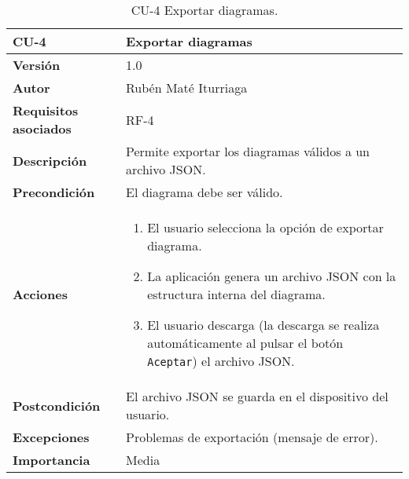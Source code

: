 \begin{table}[p]
	\centering
	\begin{tabularx}{\linewidth}{ p{} p{} }
		\toprule
		\textbf{CU-4}    & \textbf{Exportar diagramas}\\
		\toprule
		\textbf{Versión}              & 1.0    \\
	\textbf{Autor}                & Rubén Maté Iturriaga \\
		\textbf{Requisitos asociados} & RF-4 \\
		\textbf{Descripción}          & Permite exportar los diagramas válidos a un archivo JSON. \\
		\textbf{Precondición}         & El diagrama debe ser válido. \\
		\textbf{Acciones}             &
		\begin{enumerate}
			\def\labelenumi{\arabic{enumi}.}
			\tightlist
			\item El usuario selecciona la opción de exportar diagrama.
			\item La aplicación genera un archivo JSON con la estructura interna del diagrama.
			\item El usuario descarga (la descarga se realiza automáticamente al pulsar el botón \texttt{Aceptar}) el archivo JSON.
		\end{enumerate}\\
		\textbf{Postcondición}        & El archivo JSON se guarda en el dispositivo del usuario. \\
		\textbf{Excepciones}          & Problemas de exportación (mensaje de error). \\
		\textbf{Importancia}          & Media \\
		\bottomrule
	\end{tabularx}
	\caption{CU-4 Exportar diagramas.}
\end{table}

